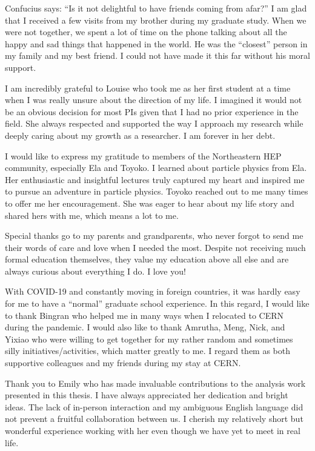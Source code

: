 \begin{acknowledgments}

Confucius says: ``Is it not delightful to have friends coming from afar?'' I am glad that I received a few visits from my brother during my graduate study. When we were not together, we spent a lot of time on the phone talking about all the happy and sad things that happened in the world. He was the ``closest'' person in my family and my best friend. I could not have made it this far without his moral support.

I am incredibly grateful to Louise who took me as her first student at a time when I was really unsure about the direction of my life. I imagined it would not be an obvious decision for most PIs given that I had no prior experience in the field. She always respected and supported the way I approach my research while deeply caring about my growth as a researcher. I am forever in her debt.  

I would like to express my gratitude to members of the Northeastern HEP community, especially Ela and Toyoko. I learned about particle physics from Ela. Her enthusiastic and insightful lectures truly captured my heart and inspired me to pursue an adventure in particle physics. Toyoko reached out to me many times to offer me her encouragement. She was eager to hear about my life story and shared hers with me, which means a lot to me.

Special thanks go to my parents and grandparents, who never forgot to send me their words of care and love when I needed the most. Despite not receiving much formal education themselves, they value my education above all else and are always curious about everything I do. I love you!

With COVID-19 and constantly moving in foreign countries, it was hardly easy for me to have a ``normal'' graduate school experience. In this regard, I would like to thank Bingran who helped me in many ways when I relocated to CERN during the pandemic. I would also like to thank Amrutha, Meng, Nick, and Yixiao who were willing to get together for my rather random and sometimes silly initiatives/activities, which matter greatly to me. I regard them as both supportive colleagues and my friends during my stay at CERN.

Thank you to Emily who has made invaluable contributions to the analysis work presented in this thesis. I have always appreciated her dedication and bright ideas. The lack of in-person interaction and my ambiguous English language did not prevent a fruitful collaboration between us. I cherish my relatively short but wonderful experience working with her even though we have yet to meet in real life.

\end{acknowledgments}